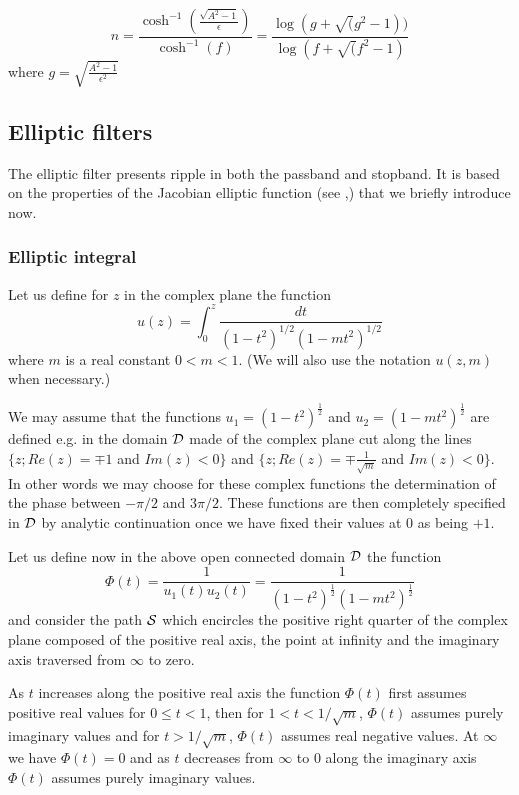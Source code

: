 $$n=\frac{\cosh^{-1}(\frac{\sqrt{A^2-1}}{\epsilon})}{\cosh^{-1}(f)} = \frac{\log(g+\sqrt(g^2-1))}{\log(f+\sqrt(f^2-1)}$$
where $g = \sqrt{\displaystyle{\frac{A^2-1}{\epsilon^2}}}$

\subsection{Elliptic filters}
The elliptic filter presents ripple in both the passband and stopband.
It is based on the properties of the Jacobian elliptic function (see \cite{dieu},\cite{Abram}) that we briefly introduce now.
\subsubsection{Elliptic integral}
Let us define for $z$ in the complex plane the function 
\begin{equation}
u(z)=\int_{0}^{z}{\frac{dt}{{(1-t^2)}^{1/2}{(1-m t^2)}^{1/2}}}
\label{ellint}
\end{equation}
where $m$ is a real constant \( 0 < m < 1 \).
(We will also use the notation $u(z,m)$ when necessary.)


We may assume that the functions $u_{1}={(1-t^2)}^{\frac{1}{2}}$ and $u_{2}={(1-m t^2)}^{\frac{1}{2}}$ are defined e.g. in the domain ${\cal D}$ made of the complex plane cut along the lines \( \{z;Re(z)=\mp 1 \) and  \(Im(z) < 0 \} \) and \( \{z;Re(z)=\mp \frac{1}{\sqrt{m}} \) and \(Im(z) < 0 \} \).
In other words we may choose for these complex functions the determination of the phase between $-\pi/2$ and $3 \pi/2$.
These functions are then completely specified in ${\cal D}$ by analytic continuation once we have fixed their values at $0$ as being $+1$.

Let us define now in the above open connected domain ${\cal D}$ the function
$$\Phi(t)=\frac{1}{u_{1}(t) u_{2}(t)}=\frac{1}{{(1-t^2)}^{\frac{1}{2}}{(1-m t^2)}^{\frac{1}{2}}}$$
and consider the path ${\cal S}$ which encircles the positive right quarter of the complex plane composed of the positive real axis, the point at infinity and the imaginary axis traversed from ${\infty}$ to zero.

As $t$ increases along the positive real axis the function $\Phi(t)$ first assumes positive real values for $0 \leq t <1$, then for $1 < t < 1/{\sqrt{m}}$, $\Phi(t)$ assumes purely imaginary values and for $t > 1/{\sqrt{m}}$, $\Phi(t)$ assumes real negative values.
At $\infty$ we have $\Phi(t)=0$ and as $t$ decreases from $\infty$ to $0$ along the imaginary axis $\Phi(t)$ assumes purely imaginary values.

